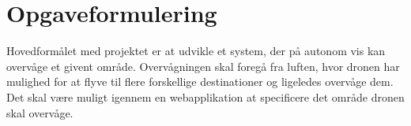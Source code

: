 \chapter{Opgaveformulering}
\label{chap:opgaveformulering}

Hovedformålet med projektet er at udvikle et system, der på autonom vis kan overvåge et givent område. Overvågningen skal foregå fra luften, hvor dronen har mulighed for at flyve til flere forskellige destinationer og ligeledes overvåge dem. Det skal være muligt igennem en webapplikation at specificere det område dronen skal overvåge.

